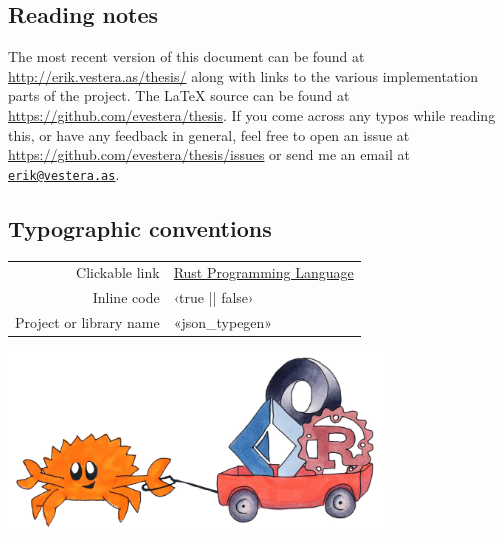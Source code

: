
\vspace*{2cm}
\thispagestyle{plain}

\begin{center}

{}

\section*{\hfil Reading notes \hfil}

\end{center}

The most recent version of this document can be found at \url{http://erik.vestera.as/thesis/} along with links to the various implementation parts of the project. The LaTeX source can be found at \url{https://github.com/evestera/thesis}. If you come across any typos while reading this, or have any feedback in general, feel free to open an issue at \url{https://github.com/evestera/thesis/issues} or send me an email at \href{mailto:erik@vestera.as}{\nolinkurl{erik@vestera.as}}.

\begin{center}

\subsection*{\hfil Typographic conventions \hfil}

\begin{tabular}{ r l }
Clickable link & \href{https://www.rust-lang.org/}{Rust Programming Language} \\
Inline code & ‹true || false› \\
Project or library name & «json_typegen» \\
\end{tabular}

\vspace*{1cm}
\includegraphics[width=10cm, angle=0, trim=10 10 10 10, clip]{ferris/cart2}

\end{center}
